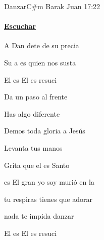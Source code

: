 \documentclass[12pt, spanish]{book}
\newcommand{\NotCCLIed}{\relax}
\begin{document}
    \begin{song}{Danzar}{C\#m}
    {} %
    {Barak}
    {Juan 17:22} %
    {} %
        \ifChordBk
        \paragraph{\mbox{}\hfill\protect\href{https://open.spotify.com/intl-es/track/3Y14MbxBGJ7nnA0DVTDlQd}{Escuchar}\mbox{}\hfill}
        \fi



        \begin{SBChorus}
            A Dan dete de su precia

            Su a es quien nos susta

            El es  El es  resuci
        \end{SBChorus}


        \begin{SBOpGroup}
            Da un paso al frente

            Has algo diferente

            Demos toda gloria a Jesús


            Levanta tus manos

            Grita que el es Santo

            es El gran yo soy murió en la 
        \end{SBOpGroup}

        \begin{SBOpGroup}
             tu respiras tienes que adorar

             nada te impida danzar
        \end{SBOpGroup}

        \begin{SBOpGroup}
            El es  El es  resuci


\end{SBOpGroup}
\end{song}
\end{document}
